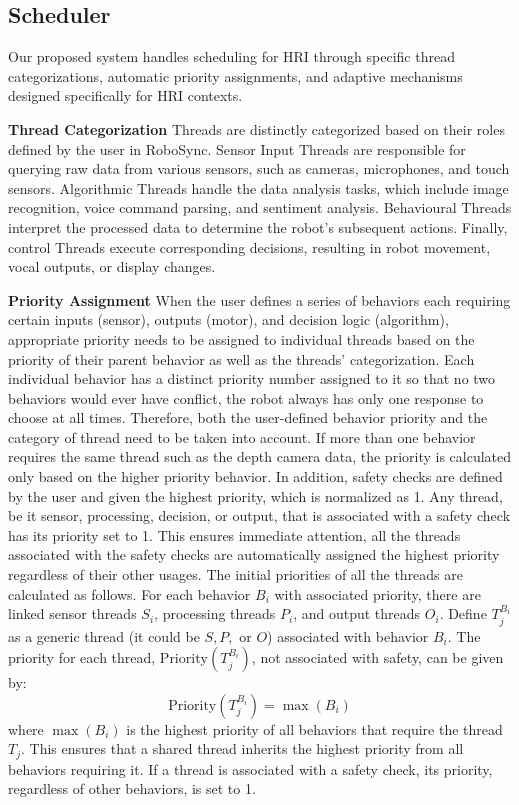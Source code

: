 \documentclass[runningheads]{llncs}
\begin{document}
\subsection{Scheduler}

Our proposed system handles scheduling for HRI through specific thread categorizations, automatic priority assignments, and adaptive mechanisms designed specifically for HRI contexts.

\vspace{0.5cm}
\noindent\textbf{Thread Categorization}
Threads are distinctly categorized based on their roles defined by the user in RoboSync. Sensor Input Threads are responsible for querying raw data from various sensors, such as cameras, microphones, and touch sensors. Algorithmic Threads handle the data analysis tasks, which include image recognition, voice command parsing, and sentiment analysis. Behavioural Threads interpret the processed data to determine the robot's subsequent actions. Finally, control Threads execute corresponding decisions, resulting in robot movement, vocal outputs, or display changes. 

\vspace{0.5cm}
\noindent\textbf{Priority Assignment}
When the user defines a series of behaviors each requiring certain inputs (sensor), outputs (motor), and decision logic (algorithm), appropriate priority needs to be assigned to individual threads based on the priority of their parent behavior as well as the threads' categorization. Each individual behavior has a distinct priority number assigned to it so that no two behaviors would ever have conflict, the robot always has only one response to choose at all times. Therefore, both the user-defined behavior priority and the category of thread need to be taken into account. 
If more than one behavior requires the same thread such as the depth camera data, the priority is calculated only based on the higher priority behavior. In addition, safety checks are defined by the user and given the highest priority, which is normalized as 1. Any thread, be it sensor, processing, decision, or output, that is associated with a safety check has its priority set to 1. This ensures immediate attention, all the threads associated with the safety checks are automatically assigned the highest priority regardless of their other usages. The initial priorities of all the threads are calculated as follows. 
For each behavior \( B_i \) with associated priority, there are linked sensor threads \( S_{i} \), processing threads \( P_{i} \), and output threads \( O_{i} \). Define \( T_{j}^{B_i} \) as a generic thread (it could be \( S, P, \) or \( O \)) associated with behavior \( B_i \). The priority for each thread, \( \text{Priority}(T_{j}^{B_i}) \), not associated with safety, can be given by: \[ \text{Priority}(T_{j}^{B_i}) = \max(B_i)  \]
where \( \max(B_i) \) is the highest priority of all behaviors that require the thread \( T_{j} \). This ensures that a shared thread inherits the highest priority from all behaviors requiring it. If a thread is associated with a safety check, its priority, regardless of other behaviors, is set to 1.
\end{document}
